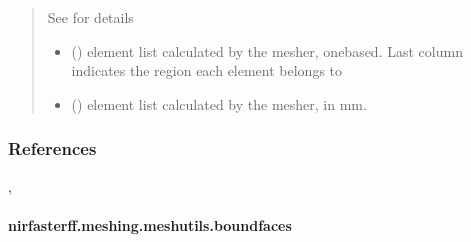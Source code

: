 \documentclass[letterpaper,10pt,english]{sphinxmanual}
\begin{document}
\begin{fulllineitems}
\begin{quote}
\begin{description}
\begin{itemize}
\sphinxAtStartPar
See {\hyperref[\detokenize{_autosummary/nirfasterff.utils.MeshingParams:nirfasterff.utils.MeshingParams}]{}} for details


\end{itemize}

\sphinxAtStartPar
\begin{itemize}
\item {} 
\sphinxAtStartPar
{} () \textendash{} element list calculated by the mesher, one\sphinxhyphen{}based. Last column indicates the region each element belongs to

\item {} 
\sphinxAtStartPar
{} () \textendash{} element list calculated by the mesher, in mm.

\end{itemize}


\end{description}\end{quote}
\subsubsection*{References}

\sphinxAtStartPar
{},

\end{fulllineitems}


\sphinxstepscope


\paragraph{nirfasterff.meshing.meshutils.boundfaces}
\label{\detokenize{_autosummary/nirfasterff.meshing.meshutils.boundfaces:nirfasterff-meshing-meshutils-boundfaces}}\label{\detokenize{_autosummary/nirfasterff.meshing.meshutils.boundfaces::doc}}
\end{document}
